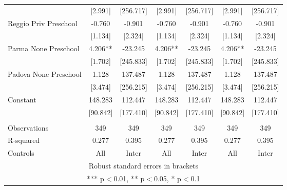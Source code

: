 \begin{tabular}{lcccccc}
 & [2.991] & [256.717] & [2.991] & [256.717] & [2.991] & [256.717] \\
Reggio Priv Preschool & -0.760 & -0.901 & -0.760 & -0.901 & -0.760 & -0.901 \\
 & [1.134] & [2.324] & [1.134] & [2.324] & [1.134] & [2.324] \\
Parma None Preschool & 4.206** & -23.245 & 4.206** & -23.245 & 4.206** & -23.245 \\
 & [1.702] & [245.833] & [1.702] & [245.833] & [1.702] & [245.833] \\
Padova None Preschool & 1.128 & 137.487 & 1.128 & 137.487 & 1.128 & 137.487 \\
 & [3.474] & [256.215] & [3.474] & [256.215] & [3.474] & [256.215] \\
Constant & 148.283 & 112.447 & 148.283 & 112.447 & 148.283 & 112.447 \\
 & [90.842] & [177.410] & [90.842] & [177.410] & [90.842] & [177.410] \\
 &  &  &  &  &  &  \\
Observations & 349 & 349 & 349 & 349 & 349 & 349 \\
R-squared & 0.277 & 0.395 & 0.277 & 0.395 & 0.277 & 0.395 \\
 Controls & All & Inter & All & Inter & All & Inter \\ \hline
\multicolumn{7}{c}{ Robust standard errors in brackets} \\
\multicolumn{7}{c}{ *** p$<$0.01, ** p$<$0.05, * p$<$0.1} \\
\end{tabular}
